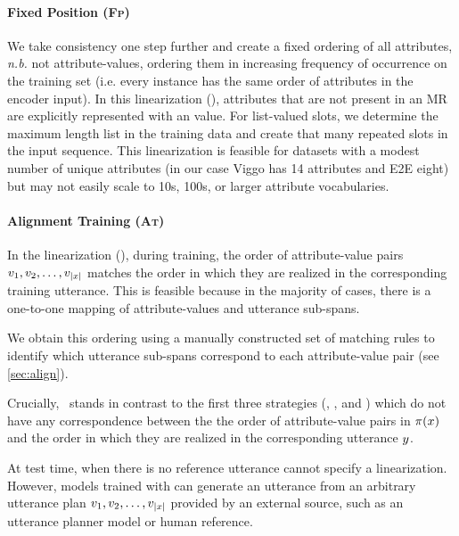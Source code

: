 \paragraph{Fixed Position (\textsc{Fp})} We take  consistency one step further
and create a fixed ordering of all attributes, \textit{n.b.} not
attribute-values, ordering them in increasing frequency of occurrence on the
training set (i.e. every instance has the same order of attributes in the
encoder input). In this  linearization (),
attributes that are not present in an MR are explicitly represented with an
 value.  For list-valued slots, we determine the maximum length
list in the training data and create that many repeated slots in the input
sequence.  This linearization is feasible for datasets with a modest number of
unique attributes (in our case Viggo has 14 attributes and E2E eight) but may 
not easily scale to 10s, 100s, or larger attribute vocabularies. 

\paragraph{Alignment Training (\textsc{At})} 

In the  linearization (), during
training, the order of attribute-value pairs $v_1, v_2, \ldots,
v_{{\lvert x \rvert}}$ matches the order in which they are realized in the
corresponding training utterance.  This is feasible because in the majority of
cases, there is a one-to-one mapping of attribute-values and utterance
sub-spans.


We obtain this ordering using a manually constructed set of matching rules to
identify which utterance sub-spans correspond to each attribute-value pair
(see \autoref{sec:align}).

Crucially, ~stands in contrast to the  first three strategies
(, , and ) which do not have any
correspondence between the the order of attribute-value pairs in $\pi(x)$
and the order in which they are realized in the corresponding utterance
$y$. %




At test time, when there is no reference utterance 
cannot specify a linearization. However, models trained with 
can generate an  utterance from an arbitrary utterance plan
$v_1, v_2, \ldots, v_{{\lvert x \rvert}}$ 
provided by an external source, such as an utterance planner model or human 
reference.
